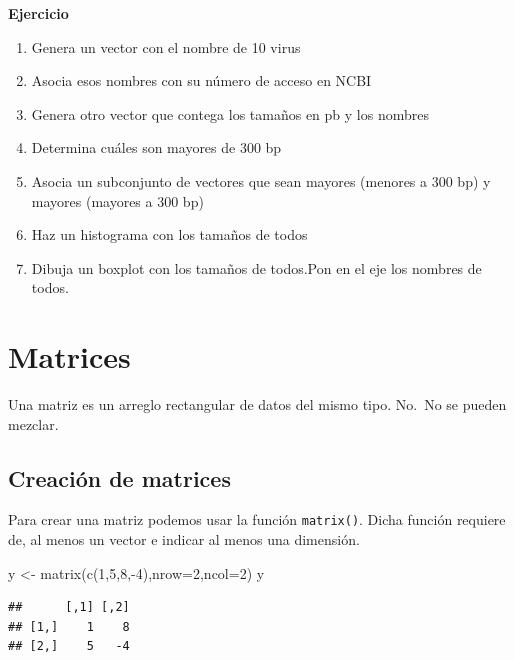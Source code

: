 \documentclass[
]{book}
\newenvironment{Shaded}{\begin{snugshade}}{\end{snugshade}}
\newcommand{\AttributeTok}[1]{\textcolor[rgb]{0.77,0.63,0.00}{#1}}
\newcommand{\DecValTok}[1]{\textcolor[rgb]{0.00,0.00,0.81}{#1}}
\newcommand{\FunctionTok}[1]{\textcolor[rgb]{0.00,0.00,0.00}{#1}}
\newcommand{\NormalTok}[1]{#1}
\newcommand{\OtherTok}[1]{\textcolor[rgb]{0.56,0.35,0.01}{#1}}
\newcommand{\SpecialCharTok}[1]{\textcolor[rgb]{0.00,0.00,0.00}{#1}}
\providecommand{\tightlist}{%
  \setlength{\itemsep}{0pt}\setlength{\parskip}{0pt}}
\begin{document}
\textbf{Ejercicio}

\begin{enumerate}
\def\labelenumi{\arabic{enumi}.}
\tightlist
\item
  Genera un vector con el nombre de 10 virus
\item
  Asocia esos nombres con su número de acceso en NCBI
\item
  Genera otro vector que contega los tamaños en pb y los nombres
\item
  Determina cuáles son mayores de 300 bp
\item
  Asocia un subconjunto de vectores que sean mayores (menores a 300 bp) y mayores (mayores a 300 bp)
\item
  Haz un histograma con los tamaños de todos
\item
  Dibuja un boxplot con los tamaños de todos.Pon en el eje los nombres de todos.
\end{enumerate}

\hypertarget{matrices}{%
\chapter{Matrices}\label{matrices}}

Una matriz es un arreglo rectangular de
datos del mismo tipo. No.~No se pueden mezclar.

\hypertarget{creaciuxf3n-de-matrices}{%
\section{Creación de matrices}\label{creaciuxf3n-de-matrices}}

Para crear una matriz podemos usar la función \texttt{matrix()}. Dicha función requiere de, al menos un vector e indicar al menos una dimensión.

\begin{Shaded}
\begin{Highlighting}[]
\NormalTok{y }\OtherTok{\textless{}{-}} \FunctionTok{matrix}\NormalTok{(}\FunctionTok{c}\NormalTok{(}\DecValTok{1}\NormalTok{,}\DecValTok{5}\NormalTok{,}\DecValTok{8}\NormalTok{,}\SpecialCharTok{{-}}\DecValTok{4}\NormalTok{),}\AttributeTok{nrow=}\DecValTok{2}\NormalTok{,}\AttributeTok{ncol=}\DecValTok{2}\NormalTok{)}
\NormalTok{y}
\end{Highlighting}
\end{Shaded}

\begin{verbatim}
##      [,1] [,2]
## [1,]    1    8
## [2,]    5   -4
\end{verbatim}
\end{document}
